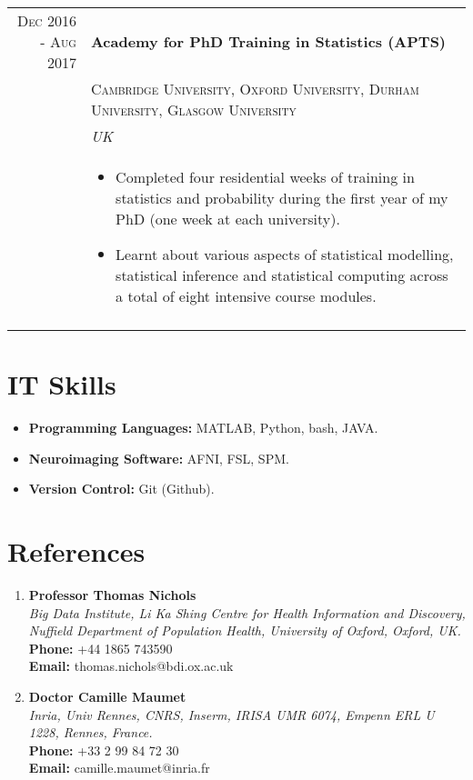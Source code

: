 \documentclass[a4paper,10pt]{article}
\begin{document}
\begin{tabular}{rl}
\textsc{Dec} 2016 - \textsc{Aug} 2017
& \large{\textbf{Academy for PhD Training in Statistics (APTS)}}\\
& \textsc{Cambridge University, Oxford University, Durham University, Glasgow University}\\
& \textit{UK} \\
&\begin{minipage}[t]{0.8\textwidth}
 \begin{itemize}[leftmargin=*]
 \item Completed four residential weeks of training in statistics and probability during the first year of my PhD (one week at each university).
 \item Learnt about various aspects of statistical modelling, statistical inference and statistical computing across a total of eight intensive course modules. 
\end{itemize}
\end{minipage}\\&\\

\end{tabular}


\section{IT Skills}
\begin{minipage}[t]{0.9\textwidth}
 \begin{itemize}
 \item \textbf{Programming Languages:} MATLAB, Python, bash, JAVA.
 \item \textbf{Neuroimaging Software:} AFNI, FSL, SPM. 
 \item \textbf{Version Control:} Git (Github). 
 \end{itemize}
\end{minipage}

\section{References}
\begin{enumerate}
\item \textbf{Professor Thomas Nichols} \\
\textit{Big Data Institute, Li Ka Shing Centre for Health Information and Discovery, Nuffield Department of Population
Health, University of Oxford, Oxford, UK.} \\
\textbf{Phone:} 	+44 1865 743590\\
\textbf{Email:} thomas.nichols@bdi.ox.ac.uk\\
	
\item \textbf{Doctor Camille Maumet} \\
\textit{Inria, Univ Rennes, CNRS, Inserm, IRISA UMR 6074, Empenn ERL U 1228, Rennes, France.} \\
\textbf{Phone:} 	+33 2 99 84 72 30\\
\textbf{Email:} camille.maumet@inria.fr \\
\end{enumerate}



\end{document}
